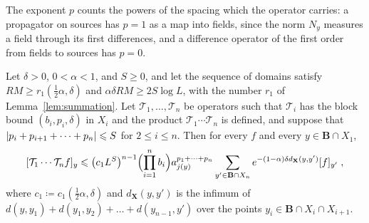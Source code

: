 \documentclass[11pt]{preprint}
\DeclarePairedDelimiter{\abs}{\lvert}{\rvert}
\numberwithin{equation}{section}
\begin{document}
The exponent $p$ counts the powers of the spacing which the operator carries: a propagator on sources has $p = 1$ as a map into fields, since the norm $N_y$ measures a field through its first differences, and a difference operator of the first order from fields to sources has $p = 0$.

\begin{lemma}\label{lem:composition}
Let $\delta > 0$, $0 < \alpha < 1$, and $S \geqslant 0$, and let the sequence of domains satisfy $RM \geqslant r_1(\frac{1}{2}\alpha, \delta)$ and $\alpha\delta RM \geqslant 2S\log L$, with the number $r_1$ of Lemma~\ref{lem:summation}. Let $\mathcal T_1, \dots, \mathcal T_n$ be operators such that $\mathcal T_i$ has the block bound $(b_i, p_i, \delta)$ in $X_i$ and the product $\mathcal T_1\cdots\mathcal T_n$ is defined, and suppose that $\abs{p_i + p_{i+1} + \dots + p_n} \leqslant S$ for $2 \leqslant i \leqslant n$. Then for every $f$ and every $y \in \mathbf B \cap X_1$,
\begin{equation}\label{eq:composition}
    [\mathcal T_1\cdots\mathcal T_nf]_y \leqslant \bigl(c_1L^S\bigr)^{n-1}\Bigl(\prod_{i=1}^{n}b_i\Bigr)a_{j(y)}^{p_1 + \dots + p_n}\sum_{y' \in \mathbf B \cap X_n}e^{-(1 - \alpha)\delta d_{\mathbf X}(y, y')}[f]_{y'}\;,
\end{equation}
where $c_1 \coloneqq c_1(\frac{1}{2}\alpha, \delta)$ and $d_{\mathbf X}(y, y')$ is the infimum of $d(y, y_1) + d(y_1, y_2) + \dots + d(y_{n-1}, y')$ over the points $y_i \in \mathbf B \cap X_i \cap X_{i+1}$.
\end{lemma}
\end{document}
